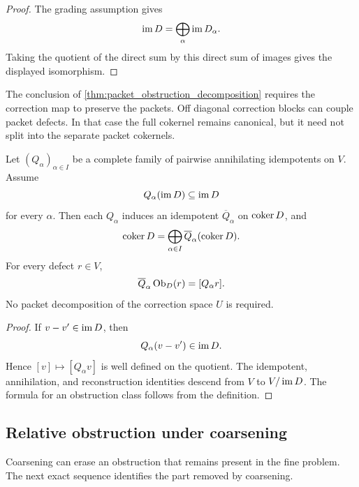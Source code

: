 \begin{proof}
The grading assumption gives
\[
\operatorname{im} D=\bigoplus_\alpha\operatorname{im} D_\alpha.
\]
Taking the quotient of the direct sum by this direct sum of images gives the displayed isomorphism.
\end{proof}

\begin{remark}\label{rem:block_diagonal_needed}
The conclusion of \cref{thm:packet_obstruction_decomposition} requires the correction map to preserve the packets.  Off diagonal correction blocks can couple packet defects.  In that case the full cokernel remains canonical, but it need not split into the separate packet cokernels.
\end{remark}

\begin{proposition}\label{prop:obstruction_quotient_projectors}
Let $(Q_\alpha)_{\alpha\in I}$ be a complete family of pairwise annihilating idempotents on $V$.  Assume
\[
Q_\alpha(\operatorname{im} D)\subseteq\operatorname{im} D
\]
for every $\alpha$.  Then each $Q_\alpha$ induces an idempotent $\overline Q_\alpha$ on $\operatorname{coker} D$, and
\[
\operatorname{coker} D
=
\bigoplus_{\alpha\in I}\overline Q_\alpha(\operatorname{coker} D).
\]
For every defect $r\in V$,
\[
\overline Q_\alpha\operatorname{Ob}_D(r)
=
[Q_\alpha r].
\]
No packet decomposition of the correction space $U$ is required.
\end{proposition}

\begin{proof}
If $v-v'\in\operatorname{im} D$, then
\[
Q_\alpha(v-v')\in\operatorname{im} D.
\]
Hence $[v]\mapsto[Q_\alpha v]$ is well defined on the quotient.  The idempotent, annihilation, and reconstruction identities descend from $V$ to $V/\operatorname{im} D$.  The formula for an obstruction class follows from the definition.
\end{proof}

\subsection{Relative obstruction under coarsening}

Coarsening can erase an obstruction that remains present in the fine problem.  The next exact sequence identifies the part removed by coarsening.

